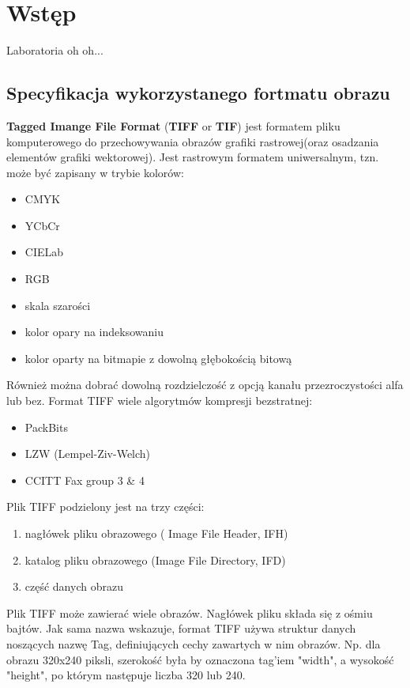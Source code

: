 \documentclass[final,a4paper,openany,12pt]{mwbk}
\begin{document}
\tableofcontents
\listoffigures

\sloppy


\chapter {Wstęp}

Laboratoria oh oh...~\cite{BookMok} %


\section {Specyfikacja wykorzystanego fortmatu obrazu}
\textbf{Tagged Imange File Format} (\textbf{TIFF} or \textbf{TIF}) jest formatem pliku komputerowego do przechowywania obrazów grafiki rastrowej(oraz osadzania elementów grafiki wektorowej). Jest rastrowym formatem uniwersalnym, tzn. może być zapisany w trybie kolorów:
\begin{itemize}
	\item CMYK
	\item YCbCr
	\item CIELab
	\item RGB
	\item skala szarości
	\item kolor opary na indeksowaniu
	\item kolor oparty na bitmapie z dowolną głębokością bitową
\end{itemize}
Również można dobrać dowolną rozdzielczość z opcją kanału przezroczystości alfa lub bez.
Format TIFF wiele algorytmów kompresji bezstratnej:
\begin{itemize}
	\item PackBits
	\item LZW (Lempel-Ziv-Welch)
	\item CCITT Fax group 3 \& 4
\end{itemize}
Plik TIFF podzielony jest na trzy części:
\begin{enumerate}
	\item nagłówek pliku obrazowego ( Image File Header, IFH)
	\item katalog pliku obrazowego (Image File Directory, IFD)
	\item część danych obrazu
\end{enumerate}
Plik TIFF może zawierać wiele obrazów. Nagłówek pliku składa się
z ośmiu bajtów. Jak sama nazwa wskazuje, format TIFF używa struktur danych noszących nazwę Tag, definiujących cechy zawartych w nim obrazów. Np. dla obrazu 320x240 piksli, szerokość była by oznaczona tag'iem "width", a wysokość "height", po którym następuje liczba 320 lub 240.
\end{document}
